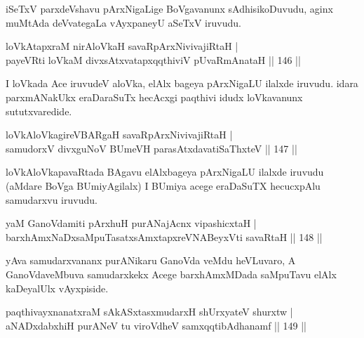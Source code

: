 \begin{artha}
iSeTxV parxdeVshavu pArxNigaLige BoVgavanunx sAdhisikoDuvudu, aginx muMtAda deVvategaLa vAyxpaneyU aSeTxV iruvudu.
\end{artha}


\begin{shl}
loVkAtapxraM nirAloVkaH savaRpArxNivivajiRtaH |\\
payeVRti loVkaM divxsAtxvatapxqqthiviV pUvaRmAnataH \hfill || 146 ||
\end{shl}

\begin{artha}
I loVkada Ace iruvudeV aloVka, elAlx bageya pArxNigaLU ilalxde iruvudu. idara parxmANakUkx eraDaraSuTx hecAcxgi paqthivi idudx loVkavanunx sututxvaredide.
\end{artha}

\begin{shl}
loVkAloVkagireVBARgaH savaRpArxNivivajiRtaH |\\
samudorxV divxguNoV BUmeVH parasAtxdavatiSaThxteV \hfill || 147 ||
\end{shl}

\begin{artha}
loVkAloVkapavaRtada BAgavu elAlxbageya pArxNigaLU ilalxde iruvudu (aMdare BoVga BUmiyAgilalx) I BUmiya acege eraDaSuTX hecucxpAlu samudarxvu iruvudu.
\end{artha}

\begin{shl}
\footnotemark{}yaM GanoVdamiti pArxhuH purANajAcnx vipashicxtaH |\\
barxhAmxNaDxsaMpuTasatxsAmxtapxreVNABeyxVti savaRtaH \hfill || 148 ||
\end{shl}

\begin{artha}
yAva samudarxvananx purANikaru GanoVda veMdu heVLuvaro, A GanoVdaveMbuva samudarxkekx Acege barxhAmxMDada saMpuTavu elAlx kaDeyalUlx vAyxpiside.
\end{artha}


\begin{shl}
paqthivayxnanatxraM sAkASxtasxmudarxH shUrxyateV shurxtw |\\
aNADxdabxhiH purANeV tu viroVdheV samxqqtibAdhanamf \hfill || 149 ||
\end{shl}

